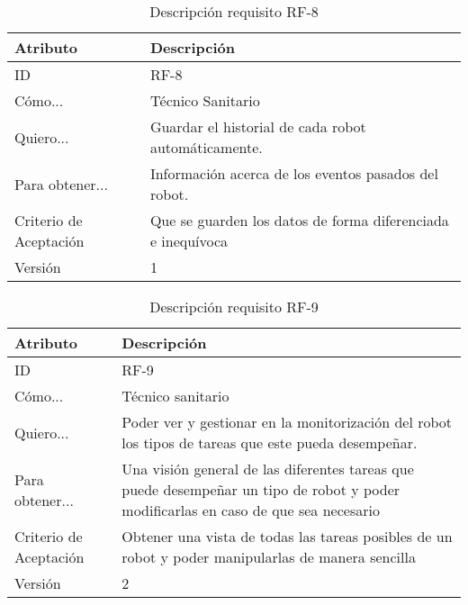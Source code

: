 
\begin{table}[H]
    \label{tab:reqF8}
 	\caption{Descripción requisito RF-8}
	\centering
	
	\begin{tabular}{C{3cm}|C{12cm}}
 		\toprule
 		\textbf{Atributo} & \textbf{Descripción} \\
 		\midrule
 	    ID & RF-8 \\
 	    Cómo... & Técnico Sanitario \\
 	    Quiero... & Guardar el historial de cada robot automáticamente. \\
 	    Para obtener... & Información acerca de los eventos pasados del robot.  \\
 	    Criterio de Aceptación & Que se guarden los datos de forma diferenciada e inequívoca  \\
 	    Versión & 1 \\
 		\bottomrule
 		\end{tabular}
\end{table}
\begin{table}[H]
    \label{tab:reqF9}
 	\caption{Descripción requisito RF-9}
	\centering

	\begin{tabular}{C{3cm}|C{12cm}}
 		\toprule
 		\textbf{Atributo} & \textbf{Descripción} \\
 		\midrule
 	    ID & RF-9 \\
 	    Cómo... & Técnico sanitario \\
 	    Quiero... & Poder ver y gestionar en la monitorización del robot los tipos de tareas que este pueda desempeñar. \\
 	    Para obtener... & Una visión general de las diferentes tareas que puede desempeñar un tipo de robot y poder modificarlas en caso de que sea necesario  \\
 	    Criterio de Aceptación & Obtener una vista de todas las tareas posibles de un robot y poder manipularlas de manera sencilla \\
 	    Versión & 2\\
 		\bottomrule
 		\end{tabular}
\end{table}

